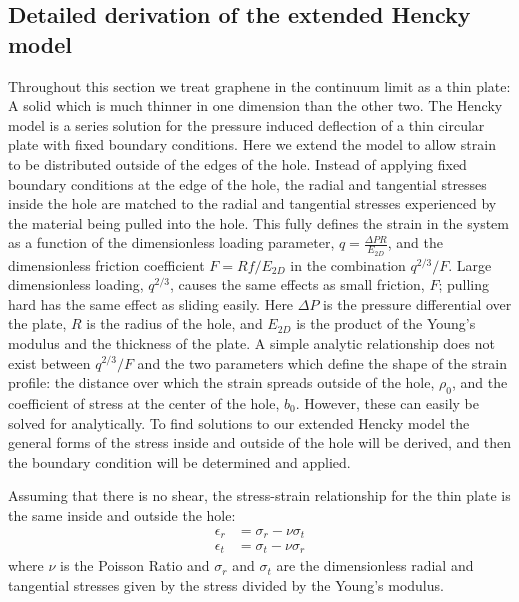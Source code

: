 \subsection{Detailed derivation of the extended Hencky model}
Throughout this section we treat graphene in the continuum limit as a thin plate: A solid which is much thinner in one dimension than the other two.
The Hencky model \cite{Hencky1915,Fichter1997} is a series solution for the pressure induced deflection of a thin circular plate with fixed boundary conditions.
Here we extend the model to allow strain to be distributed outside of the edges of the hole.
Instead of applying fixed boundary conditions at the edge of the hole, the radial and tangential stresses inside the hole are matched to the radial and tangential stresses experienced by the material being pulled into the hole.
This fully defines the strain in the system as a function of the dimensionless loading parameter, $q=\frac{\Delta PR}{E_{2D}}$, and the dimensionless friction coefficient $F=Rf/E_{2D}$ in the combination $q^{2/3}/F$.
Large dimensionless loading, $q^{2/3}$, causes the same effects as  small friction, $F$;  pulling hard has the same effect as sliding easily.
Here $\Delta P$ is the pressure differential over the plate, $R$ is the radius of the hole, and $E_{2D}$ is the product of the Young's modulus and the thickness of the plate.
A simple analytic relationship does not exist between  $q^{2/3}/F$ and the two parameters which define the shape of the strain profile: the distance over which the strain spreads outside of the hole, $\rho_0$, and the coefficient of stress at the center of the hole, $b_0$.
However, these can easily be solved for analytically.
To find solutions to our extended Hencky model the general forms of the stress inside and outside of the hole will be derived, and then the boundary condition will be determined and applied.

Assuming that there is no shear, the stress-strain relationship for the thin plate is the same inside and outside the hole\cite{Landau1986}:
\begin{align}
	\epsilon_r&=\sigma_r-\nu \sigma_t \label{eq:fri:esr}\\
	\epsilon_t&=\sigma_t-\nu \sigma_r \label{eq:fri:est}
\end{align}
where $\nu$ is the Poisson Ratio and $\sigma_r$ and $\sigma_t$ are the dimensionless radial and tangential stresses given by the stress divided by the Young's modulus.

